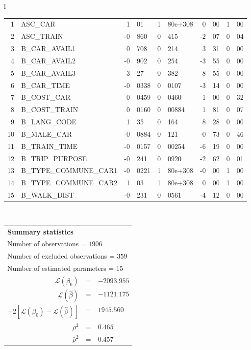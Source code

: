 \begin{tabular}{l}
\begin{tabular}{rlr@{.}lr@{.}lr@{.}lr@{.}l}
1 & ASC_CAR & 1&01 & 1&80e+308 & 0&00 & 1&00\\
2 & ASC_TRAIN & -0&860 & 0&415 & -2&07 & 0&04\\
3 & B_CAR_AVAIL1 & 0&708 & 0&214 & 3&31 & 0&00\\
4 & B_CAR_AVAIL2 & -0&902 & 0&254 & -3&55 & 0&00\\
5 & B_CAR_AVAIL3 & -3&27 & 0&382 & -8&55 & 0&00\\
6 & B_CAR_TIME & -0&0338 & 0&0107 & -3&14 & 0&00\\
7 & B_COST_CAR & 0&0459 & 0&0460 & 1&00 & 0&32\\
8 & B_COST_TRAIN & 0&0160 & 0&00884 & 1&81 & 0&07\\
9 & B_LANG_CODE & 1&35 & 0&164 & 8&28 & 0&00\\
10 & B_MALE_CAR & -0&0884 & 0&121 & -0&73 & 0&46\\
11 & B_TRAIN_TIME & -0&0157 & 0&00254 & -6&19 & 0&00\\
12 & B_TRIP_PURPOSE & -0&241 & 0&0920 & -2&62 & 0&01\\
13 & B_TYPE_COMMUNE_CAR1 & -0&0221 & 1&80e+308 & -0&00 & 1&00\\
14 & B_TYPE_COMMUNE_CAR2 & 1&03 & 1&80e+308 & 0&00 & 1&00\\
15 & B_WALK_DIST & -0&231 & 0&0561 & -4&12 & 0&00\\
\hline
\end{tabular}
\\
\begin{tabular}{rcl}
\multicolumn{3}{l}{\bf Summary statistics}\\
\multicolumn{3}{l}{ Number of observations = $1906$} \\
\multicolumn{3}{l}{ Number of excluded observations = $359$} \\
\multicolumn{3}{l}{ Number of estimated  parameters = $15$} \\
 $\mathcal{L}(\beta_0)$ &=&  $-2093.955$ \\
 $\mathcal{L}(\hat{\beta})$ &=& $-1121.175 $  \\
 $-2[\mathcal{L}(\beta_0) -\mathcal{L}(\hat{\beta})]$ &=& $1945.560$ \\
    $\rho^2$ &=&   $0.465$ \\
    $\bar{\rho}^2$ &=&    $0.457$ \\
\end{tabular}
  \end{tabular}
